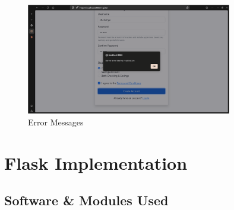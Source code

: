 \begin{figure}[h]
    \centering
    \includegraphics[width=0.8\textwidth]{express_assets/error.png}
    \caption{Error Messages}
\end{figure}

\chapter{Flask Implementation}
\section{Software \& Modules Used}

